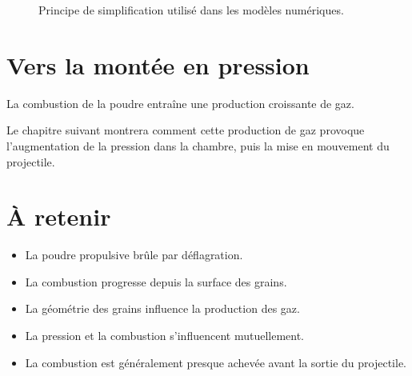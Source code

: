 \begin{figure}[htbp]
\centering


\caption{Principe de simplification utilisé dans les modèles numériques.}
\label{fig:simulation_combustion}

\end{figure}

\section{Vers la montée en pression}

La combustion de la poudre entraîne une production croissante de gaz.

Le chapitre suivant montrera comment cette production de gaz provoque
l'augmentation de la pression dans la chambre, puis la mise en mouvement du
projectile.

\section{À retenir}

\begin{aretenir}

\begin{itemize}
    \item La poudre propulsive brûle par déflagration.
    \item La combustion progresse depuis la surface des grains.
    \item La géométrie des grains influence la production des gaz.
    \item La pression et la combustion s'influencent mutuellement.
    \item La combustion est généralement presque achevée avant la sortie du projectile.
\end{itemize}

\end{aretenir}
